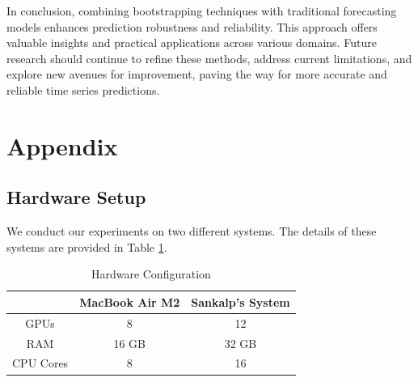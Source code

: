 In conclusion, combining bootstrapping techniques with traditional forecasting models enhances prediction robustness and reliability. This approach offers valuable insights and practical applications across various domains. Future research should continue to refine these methods, address current limitations, and explore new avenues for improvement, paving the way for more accurate and reliable time series predictions.





\section{Appendix}

\subsection{Hardware Setup}
We conduct our experiments on two different systems. The details of these systems are provided in Table \ref{tab:hardware_setup}.

\begin{table}[h]
    \centering
    \caption{Hardware Configuration}
    \label{tab:hardware_setup}
    \begin{tabular}{c|cc}\toprule
         & MacBook Air M2 & Sankalp's System  \\ \midrule
         GPUs & 8 & 12 \\
         RAM & 16 GB & 32 GB \\
         CPU Cores & 8 & 16 \\
        \bottomrule
    \end{tabular}
\end{table}

